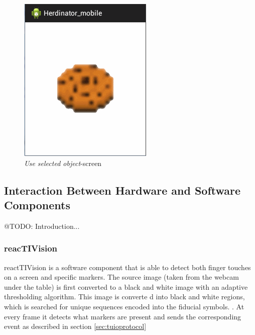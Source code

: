 \documentclass[a4paper,10pt]{report}
\begin{document}
\begin{figure}[ht]
\begin{minipage}[b]{0.30\linewidth}
			\includegraphics[width=\textwidth]{images/android-application-screen3.png}
			\caption{\emph{Use selected object}-screen}
			\label{fig:android-application-screen3}
		\end{minipage}
	\end{figure}

	\subsection{Interaction Between Hardware and Software Components}
	@TODO: Introduction...

	\subsubsection{reacTIVision}
	\label{sec:reactivision}
	reactTIVision is a software component that is able to detect both finger touches on a screen and specific markers. 
	The source image (taken from the webcam under the table) is first converted to a black and white image with an adaptive thresholding algorithm. 
	This image is converte	d into black and white regions, which is searched for unique sequences encoded into the fiducial symbols. \cite{reactivision}.
	At every frame it detects what markers are present and sends the corresponding event as described in section \ref{sec:tuioprotocol}
\end{document}
